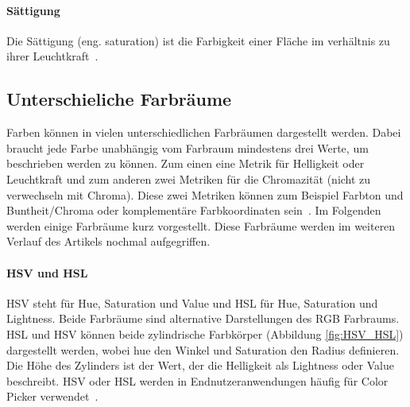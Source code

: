 \documentclass[12pt, a4paper, ngerman]{article}
\begin{document}
\paragraph{Sättigung}
Die Sättigung (eng. saturation) ist die Farbigkeit einer Fläche im verhältnis zu ihrer Leuchtkraft~\cite{Darktable_2023}.


\subsection{Unterschieliche Farbräume}
Farben können in vielen unterschiedlichen Farbräumen dargestellt werden. 
Dabei braucht jede Farbe unabhängig vom Farbraum mindestens drei Werte, um beschrieben werden zu können.
Zum einen eine Metrik für Helligkeit oder Leuchtkraft und zum anderen zwei Metriken für die Chromazität 
(nicht zu verwechseln mit Chroma). 
Diese zwei Metriken können zum Beispiel Farbton und Buntheit/Chroma oder komplementäre Farbkoordinaten sein~\cite{Darktable_2023}.
Im Folgenden werden einige Farbräume kurz vorgestellt. Diese Farbräume werden im weiteren Verlauf des Artikels nochmal aufgegriffen.

\paragraph{HSV und HSL}
\acs{HSV} steht für Hue, Saturation und Value und \acs{HSL} für Hue, Saturation und Lightness.
Beide Farbräume sind alternative Darstellungen des RGB Farbraums. 
HSL und HSV können beide zylindrische Farbkörper (Abbildung \ref{fig:HSV_HSL}) dargestellt werden, 
wobei hue den Winkel und Saturation den Radius definieren.
Die Höhe des Zylinders ist der Wert, der die Helligkeit als Lightness oder Value beschreibt.
HSV oder HSL werden in Endnutzeranwendungen häufig für Color Picker verwendet~\cite{HSL_and_HSV_2023}.
\end{document}
